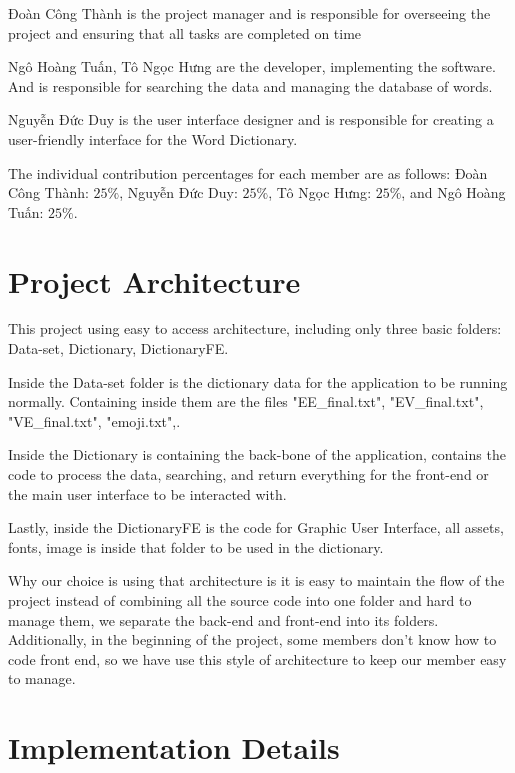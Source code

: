 \documentclass[sn-mathphys,Numbered]{sn-jnl}%
\begin{document}
\foreignlanguage{vietnamese}{Đoàn Công Thành} is the project manager and is responsible for overseeing the project and ensuring that all tasks are completed on time

\foreignlanguage{vietnamese}{Ngô Hoàng Tuấn}, \foreignlanguage{vietnamese}{Tô Ngọc Hưng} are the developer, implementing the software. And is responsible for searching the data and managing the database of words.

\foreignlanguage{vietnamese}{Nguyễn Đức Duy} is the user interface designer and is responsible for creating a user-friendly interface for the Word Dictionary.

The individual contribution percentages for each member are as follows: \foreignlanguage{vietnamese}{Đoàn Công Thành}: $25\%$, \foreignlanguage{vietnamese}{Nguyễn Đức Duy}: $25\%$, \foreignlanguage{vietnamese}{Tô Ngọc Hưng}: $25\%$, and \foreignlanguage{vietnamese}{Ngô Hoàng Tuấn}: $25\%$.

\section{Project Architecture}

This project using easy to access architecture, including only three basic folders: Data-set, Dictionary, DictionaryFE.

Inside the Data-set folder is the dictionary data for the application to be running normally. Containing inside them are the files "EE\_final.txt", "EV\_final.txt", "VE\_final.txt", "emoji.txt",.

Inside the Dictionary is containing the back-bone of the application, contains the code to process the data, searching, and return everything for the front-end or the main user interface to be interacted with.

Lastly, inside the DictionaryFE is the code for Graphic User Interface, all assets, fonts, image is inside that folder to be used in the dictionary.

Why our choice is using that architecture is it is easy to maintain the flow of the project instead of combining all the source code into one folder and hard to manage them, we separate the back-end and front-end into its folders. Additionally, in the beginning of the project, some members don't know how to code front end, so we have use this style of architecture to keep our member easy to manage.


\section{Implementation Details}
\end{document}
